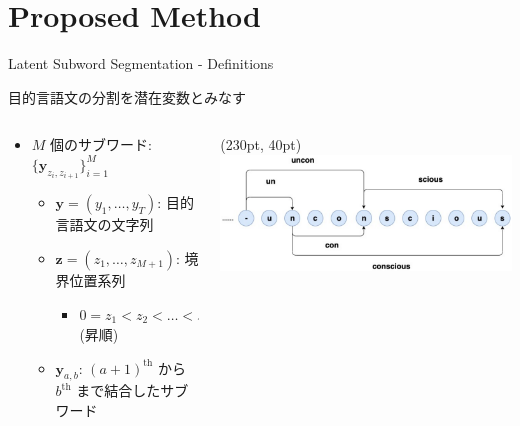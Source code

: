 \documentclass[unicode, 12pt, xdvipdfmx, aspectratio=43]{beamer}
\begin{document}
\section{Proposed Method}
\label{sec:org8c348fe}
\begin{frame}[label={sec:orgf4662e8}]{Latent Subword Segmentation - Definitions}
\begin{block}{\hspace{-0.75cm}目的言語文の分割を潜在変数とみなす}
\begin{columns}
\begin{column}{1.0\columnwidth}
\begin{itemize}
\item \(M\) 個のサブワード: \(\{\boldsymbol{y}_{z_i, z_{i+1}}\}_{i=1}^M\)
\begin{itemize}
\item \(\boldsymbol{y} = (y_1, \ldots, y_T)\): 目的言語文の文字列
\item \(\boldsymbol{z} = (z_1 ,\ldots, z_{M+1})\): 境界位置系列
\begin{itemize}
\item \(0 = z_1 < z_2 < \ldots < z_M < z_{M+1} = T\) (昇順)
\end{itemize}
\item \(\boldsymbol{y}_{a,b}\): \((a+1)^\text{th}\) から \(b^\text{th}\) まで結合したサブワード
\end{itemize}
\end{itemize}
\end{column}

\begin{column}{0.42\columnwidth}
\begin{textblock*}{\linewidth}(230pt, 40pt)
    \centering
    \includegraphics[width=\linewidth]{./figure/Figure1.pdf}
\end{textblock*}
\end{column}
\end{columns}
\end{block}


\end{frame}
\end{document}
